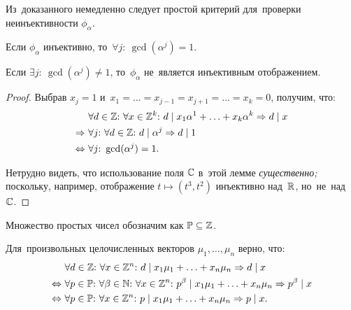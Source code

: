 \documentclass[a4paper,oneside]{article}
\begin{document}
Из~доказанного немедленно следует простой критерий для~проверки неинъективности $\phi_\alpha$.

\begin{lemma*}
    Если $\phi_\alpha$ инъективно, то~$\forall j{:}\ \gcd(\alpha^j) = 1$.
\end{lemma*}

\begin{consequence*}
    Если $\exists j{:}\ \gcd(\alpha^j) \neq 1$, то~$\phi_\alpha$ не~является инъективным отображением.
\end{consequence*}

\begin{proof}
    Выбрав $x_j = 1$ и~$x_1 = \ldots = x_{j - 1} = x_{j + 1} = \ldots = x_k = 0$, получим, что:
    \begin{align*}
                         & \forall d \in \mathbb{Z}{:}\ \forall x \in \mathbb{Z}^k{:}\ d \mid x_1 \alpha^1 + \ldots + x_k \alpha^k \Rightarrow d \mid x \\
            \Rightarrow\ & \forall j{:}\ \forall d \in \mathbb{Z}{:}\ d \mid \alpha^j \Rightarrow d \mid 1 \\
        \Leftrightarrow\ & \forall j{:}\ \gcd(\alpha^j) = 1.
    \end{align*}

    Нетрудно видеть, что использование поля $\mathbb{C}$ в~этой лемме \textit{существенно;} поскольку, например,
    отображение $t \mapsto (t^3, t^2)$ инъективно над~$\mathbb{R}$, но~не~над~$\mathbb{C}$.
\end{proof}

Множество простых чисел обозначим как $\mathbb{P} \subseteq \mathbb{Z}$.

\begin{lemma*}
    Для~произвольных целочисленных векторов $\mu_1, \ldots, \mu_n$ верно, что:
    \begin{align*}
                         & \forall d \in \mathbb{Z}{:}\ \forall x \in \mathbb{Z}^n{:}\ d \mid x_1 \mu_1 + \ldots + x_n \mu_n \Rightarrow d \mid x \\
        \Leftrightarrow\ & \forall p \in \mathbb{P}{:}\ \forall \beta \in \mathbb{N}{:}\ \forall x \in \mathbb{Z}^n{:}\ p^\beta \mid x_1 \mu_1 + \ldots + x_n \mu_n \Rightarrow p^\beta \mid x \\
        \Leftrightarrow\ & \forall p \in \mathbb{P}{:}\ \forall x \in \mathbb{Z}^n{:}\ p \mid x_1 \mu_1 + \ldots + x_n \mu_n \Rightarrow p \mid x.
    \end{align*}
\end{lemma*}
\end{document}
